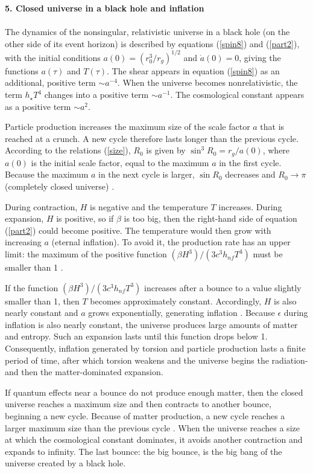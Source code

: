 \documentclass[prd,onecolumn,nofootinbib]{revtex4}
\begin{document}
{\bf 5. Closed universe in a black hole and inflation}\\ \\
The dynamics of the nonsingular, relativistic universe in a black hole (on the other side of its event horizon) is described by equations (\ref{spin8}) and (\ref{part2}),
with the initial conditions $a(0)=(r_0^3/r_g)^{1/2}$ and $\dot{a}(0)=0$, giving the functions $a(\tau)$ and $T(\tau)$.
The shear appears in equation (\ref{spin8}) as an additional, positive term $\sim a^{-4}$.
When the universe becomes nonrelativistic, the term $h_\star T^4$ changes into a positive term $\sim a^{-1}$.
The cosmological constant appears as a positive term $\sim a^{2}$.

Particle production increases the maximum size of the scale factor $a$ that is reached at a crunch.
A new cycle therefore lasts longer than the previous cycle.
According to the relations (\ref{size}), $R_0$ is given by $\sin^3 R_0=r_g/a(0)$, where $a(0)$ is the initial scale factor, equal to the maximum $a$ in the first cycle.
Because the maximum $a$ in the next cycle is larger, $\sin R_0$ decreases and $R_0\to\pi$ (completely closed universe) \cite{collapse}.

During contraction, $H$ is negative and the temperature $T$ increases.
During expansion, $H$ is positive, so if $\beta$ is too big, then the right-hand side of equation (\ref{part2}) could become positive.
The temperature would then grow with increasing $a$ (eternal inflation).
To avoid it, the production rate has an upper limit: the maximum of the positive function $(\beta H^3)/(3c^3 h_{nf}T^3)$ must be smaller than 1 \cite{ApJ}.

If the function $(\beta H^3)/(3c^3 h_{nf}T^3)$ increases after a bounce to a value slightly smaller than 1, then $T$ becomes approximately constant.
Accordingly, $H$ is also nearly constant and $a$ grows exponentially, generating inflation \cite{ApJ}.
Because $\epsilon$ during inflation is also nearly constant, the universe produces large amounts of matter and entropy.
Such an expansion lasts until this function drops below 1.
Consequently, inflation generated by torsion and particle production lasts a finite period of time, after which torsion weakens and the universe begins the radiation- and then the matter-dominated expansion.

If quantum effects near a bounce do not produce enough matter, then the closed universe reaches a maximum size and then contracts to another bounce, beginning a new cycle.
Because of matter production, a new cycle reaches a larger maximum size than the previous cycle \cite{ApJ}.
When the universe reaches a size at which the cosmological constant dominates, it avoids another contraction and expands to infinity.
The last bounce: the big bounce, is the big bang of the universe created by a black hole.
\end{document}

